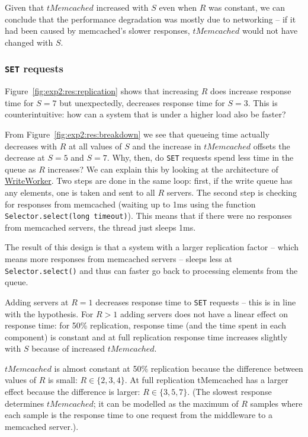 \documentclass[11pt]{article}
\newcommand{\set}[0]{\texttt{SET}}
\newcommand{\linkmain}[1]{\href{https://gitlab.inf.ethz.ch/pungast/asl-fall16-project/blob/master/src/main/java/asl/#1.java}{#1}}
\begin{document}
Given that $tMemcached$ increased with $S$ even when $R$ was constant, we can conclude that the performance degradation was mostly due to networking -- if it had been caused by memcached's slower responses, $tMemcached$ would not have changed with $S$.

\subsubsection{\set{} requests}
\label{sec:exp2:res:set}

Figure~\ref{fig:exp2:res:replication} shows that increasing $R$ does increase response time for $S=7$ but unexpectedly, decreases response time for $S=3$. This is counterintuitive: how can a system that is under a higher load also be faster?

From Figure~\ref{fig:exp2:res:breakdown} we see that queueing time actually decreases with $R$ at all values of $S$ and the increase in $tMemcached$ offsets the decrease at $S=5$ and $S=7$. Why, then, do \set{} requests spend less time in the queue as $R$ increases? We can explain this by looking at the architecture of \linkmain{WriteWorker}. Two steps are done in the same loop: first, if the write queue has any elements, one is taken and sent to all $R$ servers. The second step is checking for responses from memcached (waiting up to 1ms using the function \verb+Selector.select(long timeout)+). This means that if there were no responses from memcached servers, the thread just sleeps 1ms.

The result of this design is that a system with a larger replication factor -- which means more responses from memcached servers -- sleeps less at \verb+Selector.select()+ and thus can faster go back to processing elements from the queue.

Adding servers at $R=1$ decreases response time to \set{} requests -- this is in line with the hypothesis. For $R>1$ adding servers does not have a linear effect on response time: for 50\% replication, response time (and the time spent in each component) is constant and at full replication response time increases slightly with $S$ because of increased $tMemcached$.

$tMemcached$ is almost constant at 50\% replication because the difference between values of $R$ is small: $R \in \{2,3,4\}$. At full replication tMemcached has a larger effect because the difference is larger: $R \in \{3,5,7\}$. (The slowest response determines $tMemcached$; it can be modelled as the maximum of $R$ samples where each sample is the response time to one request from the middleware to a memcached server.).
\end{document}
